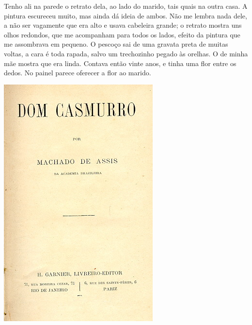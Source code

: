 \begin{myquote}


\begin{minipage}{0.6\textwidth}
Tenho ali na parede o retrato dela, ao lado do marido, tais quais na outra
casa. A pintura escureceu muito, mas ainda dá ideia de ambos. Não me lembra
nada dele, a não ser vagamente que era alto e usava cabeleira grande; o
retrato mostra uns olhos redondos, que me acompanham para todos os lados,
efeito da pintura que me assombrava em pequeno. O pescoço sai de uma gravata
preta de muitas voltas, a cara é toda rapada, salvo um trechozinho pegado às
orelhas. O de minha mãe mostra que era linda. Contava então vinte anos, e
tinha uma flor entre os dedos. No painel parece oferecer a flor ao marido.
\end{minipage}
\hfill
\begin{minipage}{0.35\textwidth}
  \centering
  \includegraphics[width=\textwidth]{./imgSAEB_7_POR/media/image55.png}
\end{minipage}


\end{myquote}
